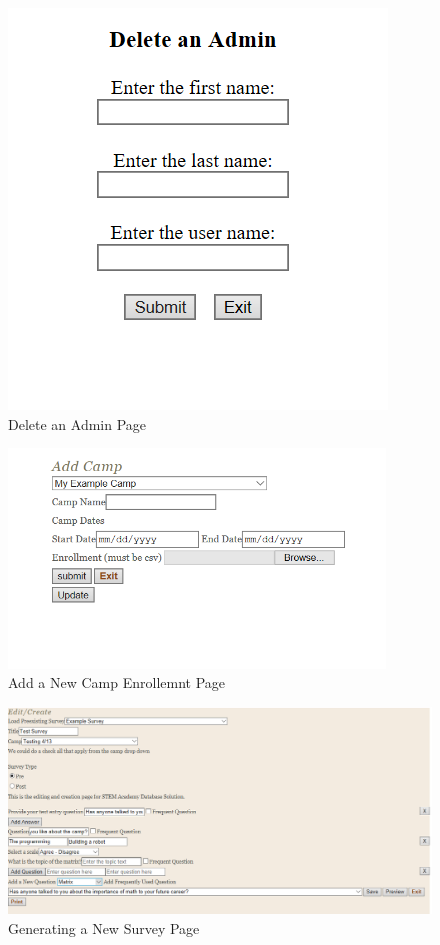 \documentclass[letterpaper,10pt,serif,draftclsnofoot,onecolumn,compsoc,titlepage]{IEEEtran}
\begin{document}
\begin{figure}[!htbp]
\centering
\includegraphics[scale=.9]{ProjectImages/DeleteAdmin.png}
\caption{Delete an Admin Page}
\label{fig:code2}
\end{figure}

\begin{figure}[!htbp]
\centering
\includegraphics[scale=.2, width=100mm]{ProjectImages/AddCamp.png}
\caption{Add a New Camp Enrollemnt Page}
\label{fig:code2}
\end{figure}  

\begin{figure}[!htbp]
\centering
\includegraphics[scale=.8]{ProjectImages/SurveyGeneration.png}
\caption{Generating a New Survey Page}
\label{fig:code2}
\end{figure}  
\end{document}
